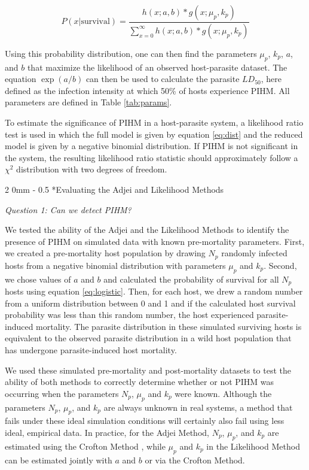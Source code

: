 \documentclass[12pt, a4paper]{article}
\makeatletter
\renewcommand{\subsection}{\@startsection
{subsection}%
{2}%
{0mm}%
{-\baselineskip}%
{0.5\baselineskip}%
{\normalfont\bf}} %
\makeatother
\begin{document}
\begin{equation}
    P(x | \text{survival}) = \dfrac{h(x; a, b)  * g(x; \mu_p, k_p)}{\sum_{x=0}^{\infty} h(x; a, b)  * g(x; \mu_p, k_p)}
    \label{eq:dist}
\end{equation}

Using this probability distribution, one can then find the parameters $\mu_p$, $k_p$, $a$, and $b$ that maximize the likelihood of an observed host-parasite dataset. The equation $\exp(a / b)$ can then be used to calculate the parasite $LD_{50}$, here defined as the infection intensity at which 50\% of hosts experience PIHM.  All parameters are defined in Table \ref{tab:params}.

To estimate the significance of PIHM in a host-parasite system, a
likelihood ratio test is used in which the full model is given by equation
\ref{eq:dist} and the reduced model is given by a negative binomial
distribution.  If PIHM is not significant in the system, the resulting likelihood
ratio statistic should approximately follow a $\chi^2$ distribution with two degrees of freedom.

\subsection*{Evaluating the Adjei and Likelihood Methods}

\emph{Question 1: Can we detect PIHM?}

We tested the ability of the Adjei and the Likelihood Methods to identify the presence of PIHM on simulated data with known pre-mortality parameters. First, we created a pre-mortality host population by drawing $N_p$ randomly infected hosts from a
negative binomial distribution with parameters $\mu_p$ and $k_p$. Second, we chose values of $a$ and $b$ and calculated the probability of survival
for all $N_p$ hosts using equation \ref{eq:logistic}.  Then, for each host, we drew a random number from a uniform distribution
between 0 and 1 and if the calculated host survival probability was less than this random
number, the host experienced parasite-induced mortality. The parasite distribution in these simulated surviving hosts is equivalent to the observed parasite distribution in a wild host population that has undergone parasite-induced host mortality.

We used these simulated pre-mortality and post-mortality datasets to test the
ability of both methods to correctly determine whether or not PIHM was
occurring when the parameters $N_p$, $\mu_p$ and $k_p$ were known.  Although
the parameters $N_p$, $\mu_p$, and $k_p$ are always unknown in real systems, a
method that fails under these ideal simulation conditions will certainly also
fail using less ideal, empirical data. In practice, for the Adjei Method, $N_p$, $\mu_p$,
and $k_p$ are estimated using the Crofton Method \citep{Adjei1986}, while $\mu_p$ and $k_p$ in
the Likelihood Method can be estimated jointly with $a$ and $b$ or via the
Crofton Method.
\end{document}
